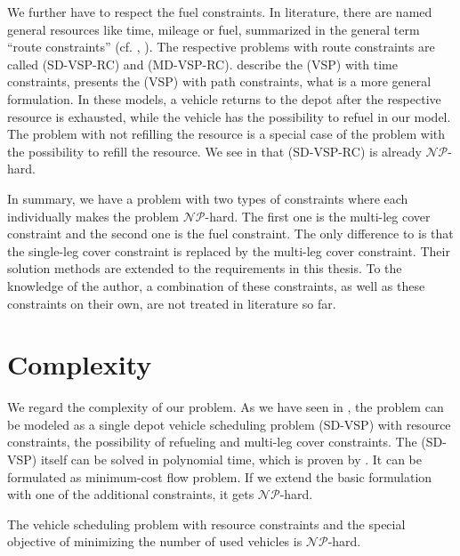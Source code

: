 We further have to respect the fuel constraints. In literature, there are named general resources like time, mileage or fuel, summarized in the general term \enquote{route constraints} (cf. \cite[p. 16]{Bunte_Kliewer}, \cite{Raff}). The respective problems with route constraints are called (SD-VSP-RC) and (MD-VSP-RC). \cite{Freling_Paixao} describe  the (VSP) with time constraints, \cite{Raff} presents the (VSP) with path constraints, what is a more general formulation. In these models, a vehicle returns to the depot after the respective resource is exhausted, while the vehicle has the possibility to refuel in our model. The problem with not refilling the resource is a special case of the problem with the possibility to refill the resource. We see in  that (SD-VSP-RC) is already $\mathcal{NP}$-hard.

In summary, we have a problem with two types of constraints where each individually makes the problem $\mathcal{NP}$-hard. The first one is the multi-leg cover constraint and the second one is the fuel constraint. The only difference to \cite{Kaiser_Knoll} is that the single-leg cover constraint is replaced by the multi-leg cover constraint. Their solution methods are extended to the requirements in this thesis. To the knowledge of the author, a combination of these constraints, as well as these constraints on their own, are not treated in literature so far.


\section{Complexity}
\label{sec:complexity}

We regard the complexity of our problem. As we have seen in , the problem can be modeled as a single depot vehicle scheduling problem (SD-VSP) with resource constraints, the possibility of refueling and multi-leg cover constraints. The (SD-VSP) itself can be solved in polynomial time, which is proven by \cite{Dantzig_Fulkerson}. It can be formulated as minimum-cost flow problem. If we extend the basic formulation with one of the additional constraints, it gets $\mathcal{NP}$-hard.

\begin{theorem}
\label{th:complexity_VSPRC}

The vehicle scheduling problem with resource constraints and the special objective of minimizing the number of used vehicles is $\mathcal{NP}$-hard.

\end{theorem}

